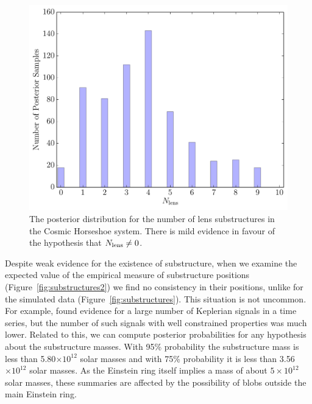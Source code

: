 \documentclass[useAMS,usenatbib]{mn2e}
\begin{document}
\begin{figure}
\begin{center}
\includegraphics[scale=0.4]{N_lens2.pdf}
\caption{The posterior distribution for the number of lens substructures
in the Cosmic Horseshoe system. There is mild evidence in favour of the
hypothesis that $N_{\rm lens} \neq 0$.\label{fig:N_lens2}}
\end{center}
\end{figure}

Despite weak evidence for the existence of substructure, when we examine the
expected value of the empirical measure of substructure positions
(Figure~\ref{fig:substructures2}) we find no consistency in their positions,
unlike for the simulated data (Figure~\ref{fig:substructures}). This situation
is not uncommon. For example, \citet{exoplanet} found evidence for a large
number of Keplerian signals in a time series, but the number of such signals
with well constrained properties was much lower. Related to this, we can
compute posterior probabilities for any hypothesis about the substructure
masses. With 95\% probability the substructure mass is less than 5.80$\times 10^{12}$ solar masses and with 75\% probability it is less than 3.56$\times 10^{12}$ solar masses. As the Einstein ring itself implies a mass of about $5 \times 10^{12}$
solar masses, these summaries are affected by the possibility of blobs outside
the main Einstein ring.
\end{document}
